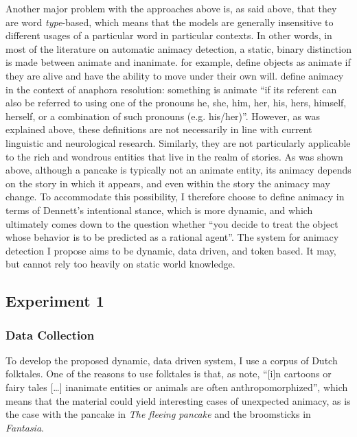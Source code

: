 Another major problem with the approaches above is, as said above, that they are word \emph{type}-based, which means that the models are generally insensitive to different usages of a particular word in particular contexts. In other words, in most of the literature on automatic animacy detection, a static, binary distinction is made between animate and inanimate. \citeauthor{bowman:2012} for example, define objects as animate if they are alive and have the ability to move under their own will\autocite{bowman:2012}. \citeauthor{orasan:2007} define animacy in the context of anaphora resolution: something is animate ``if its referent can also be referred to using one of the pronouns he, she, him, her, his, hers, himself, herself, or a combination of such pronouns (e.g. his/her)''\autocite{orasan:2007}. However, as was explained above, these definitions are not necessarily in line with current linguistic and neurological research\autocite{nieuwland:2005}. Similarly, they are not particularly applicable to the rich and wondrous entities that live in the realm of stories. As was shown above, although a pancake is typically not an animate entity, its animacy depends on the story in which it appears, and even within the story the animacy may change. To accommodate this possibility, I therefore choose to define animacy in terms of Dennett's intentional stance, which is more dynamic, and which ultimately comes down to the question whether ``you decide to treat the object whose behavior is to be predicted as a rational agent''\autocite[17]{dennett:1996}. The system for animacy detection I propose aims to be dynamic, data driven, and token based. It may, but cannot rely too heavily on static world knowledge.

\subsection{Experiment 1}

\subsubsection{Data Collection}\label{sec:animacy-data}

To develop the proposed dynamic, data driven system, I use a corpus of Dutch folktales. One of the reasons to use folktales is that, as \citeauthor{vogels:2013} note, ``[i]n cartoons or fairy tales [\ldots] inanimate entities or animals are often anthropomorphized''\autocite{vogels:2013}, which means that the material could yield interesting cases of unexpected animacy, as is the case with the pancake in \textit{The fleeing pancake} and the broomsticks in \textit{Fantasia}.

